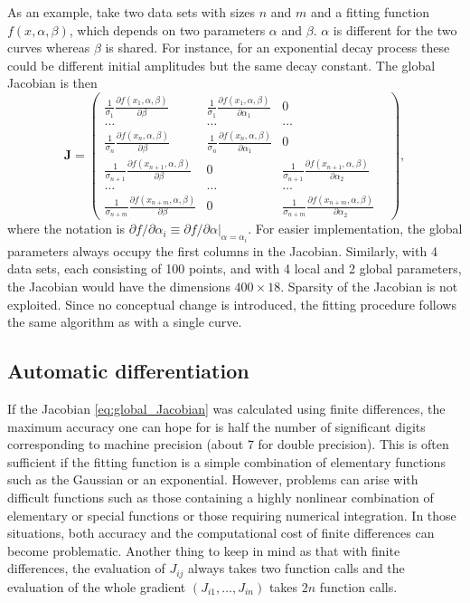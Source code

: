 \documentclass{article}
\begin{document}
As an example, take two data sets with sizes $n$ and $m$ and a fitting function $f(x,\alpha,\beta)$, which depends on two parameters $\alpha$ and $\beta$. $\alpha$ is different for the two curves whereas $\beta$ is shared. For instance, for an exponential decay process these could be different initial amplitudes but the same decay constant. The global Jacobian is then
\begin{equation}
  \label{eq:global_Jacobian}
  \bm J =
  \left( \begin{matrix}
      \frac{1}{\sigma_1} \frac{\partial f(x_1, \alpha, \beta)} {\partial\beta} & \frac{1}{\sigma_1} \frac{\partial f(x_1, \alpha, \beta)} {\partial\alpha_1} & 0 \\
      \ldots & \ldots & \ldots \\
      \frac{1}{\sigma_n} \frac{\partial f(x_n, \alpha, \beta)} {\partial\beta} & \frac{1}{\sigma_n} \frac{\partial f(x_n, \alpha, \beta)} {\partial\alpha_1} & 0 \\
      \frac{1}{\sigma_{n+1}} \frac{\partial f(x_{n+1}, \alpha, \beta)} {\partial\beta} & 0 & \frac{1}{\sigma_{n+1}} \frac{\partial f(x_{n+1}, \alpha, \beta)} {\partial\alpha_2} & \\
      \ldots & \ldots & \ldots \\
      \frac{1}{\sigma_{n+m}} \frac{\partial f(x_{n+m}, \alpha, \beta)} {\partial\beta} & 0 & \frac{1}{\sigma_{n+m}} \frac{\partial f(x_{n+m}, \alpha, \beta)} {\partial\alpha_2}
    \end{matrix} \right),
\end{equation}
where the notation is $\partial f / \partial\alpha_i \equiv \partial f / \partial\alpha |_{\alpha = \alpha_i}$. For easier implementation, the global parameters always occupy the first columns in the Jacobian. Similarly, with 4 data sets, each consisting of 100 points, and with 4 local and 2 global parameters, the Jacobian would have the dimensions $400\times18$. Sparsity of the Jacobian is not exploited. Since no conceptual change is introduced, the fitting procedure follows the same algorithm as with a single curve.

\subsection{\label{sec:ad}Automatic differentiation}

If the Jacobian \eqref{eq:global_Jacobian} was calculated using finite differences, the maximum accuracy one can hope for is half the number of significant digits corresponding to machine precision (about 7 for double precision). This is often sufficient if the fitting function is a simple combination of elementary functions such as the Gaussian or an exponential. However, problems can arise with difficult functions such as those containing a highly nonlinear combination of elementary or special functions or those requiring numerical integration. In those situations, both accuracy and the computational cost of finite differences can become problematic. Another thing to keep in mind as that with finite differences, the evaluation of $J_{ij}$ always takes two function calls and the evaluation of the whole gradient $(J_{i1}, \ldots, J_{in})$ takes $2n$ function calls.
\end{document}
